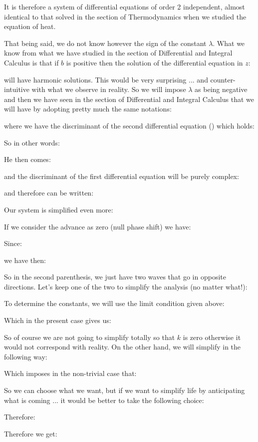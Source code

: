 	It is therefore a system of differential equations of order 2 independent, almost identical to that solved in the section of Thermodynamics when we studied the equation of heat.

	That being said, we do not know however the sign of the constant $\lambda$. What we know from what we have studied in the section of Differential and Integral Calculus is that if $b$ is positive then the solution of the differential equation in $z$:
	
	will have harmonic solutions. This would be very surprising ... and counter-intuitive with what we observe in reality. So we will impose $\lambda$ as being negative and then we have seen in the section of Differential and Integral Calculus that we will have by adopting pretty much the same notations:
	
	where we have the discriminant of the second differential equation () which holds:
	
	So in other words:
	
	He then comes:
	
	and the discriminant of the first differential equation will be purely complex:
	
	and therefore can be written:
	
	Our system is simplified even more:
	
	If we consider the advance as zero (null phase shift) we have:
	
	Since:	
	
	we have then:
	
	So in the second parenthesis, we just have two waves that go in opposite directions. Let's keep one of the two to simplify the analysis (no matter what!):
	
	To determine the constants, we will use the limit condition given above:
	
	Which in the present case gives us:
	
	So of course we are not going to simplify totally so that $k$ is zero otherwise it would not correspond with reality. On the other hand, we will simplify in the following way:
	
	Which imposes in the non-trivial case that:
	
	So we can choose what we want, but if we want to simplify life by anticipating what is coming ... it would be better to take the following choice:
	
	Therefore:
	
	Therefore we get:
	
